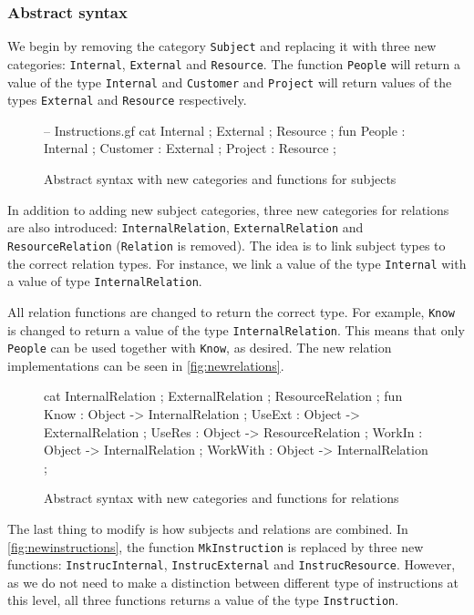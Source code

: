 \subsubsection*{Abstract syntax}
We begin by removing the category \texttt{Subject} and replacing it with three new categories: \texttt{Internal}, \texttt{External} and \texttt{Resource}. The function \texttt{People} will return a value of the type \texttt{Internal} and \texttt{Customer} and \texttt{Project} will return values of the types \texttt{External} and \texttt{Resource} respectively.

\begin{figure}[H]
\begin{code}
-- Instructions.gf
cat
  Internal ;
  External ;
  Resource ;
fun
  People   : Internal ;
  Customer : External ;
  Project  : Resource ;
\end{code}
\caption{Abstract syntax with new categories and functions for subjects}
\end{figure}

In addition to adding new subject categories, three new categories for relations are also introduced: \texttt{InternalRelation}, \texttt{ExternalRelation} and \texttt{ResourceRelation} (\texttt{Relation} is removed). The idea is to link subject types to the correct relation types. For instance, we link a value of the type \texttt{Internal} with a value of type \texttt{InternalRelation}.

All relation functions are changed to return the correct type. For example, \texttt{Know} is changed to return a value of the type \texttt{InternalRelation}. This means that only \texttt{People} can be used together with \texttt{Know}, as desired. The new relation implementations can be seen in \autoref{fig:newrelations}.

\begin{figure}[H]
\begin{code}
cat
  InternalRelation ;
  ExternalRelation ;
  ResourceRelation ;
fun
  Know     : Object -> InternalRelation ;
  UseExt   : Object -> ExternalRelation ;
  UseRes   : Object -> ResourceRelation ;
  WorkIn   : Object -> InternalRelation ;
  WorkWith : Object -> InternalRelation ;
\end{code}
\caption{Abstract syntax with new categories and functions for relations \label{fig:newrelations}}
\end{figure}

The last thing to modify is how subjects and relations are combined. In \autoref{fig:newinstructions}, the function \texttt{MkInstruction} is replaced by three new functions: \texttt{InstrucInternal}, \texttt{InstrucExternal} and \texttt{InstrucResource}. However, as we do not need to make a distinction between different type of instructions at this level, all three functions returns a value of the type \texttt{Instruction}.

